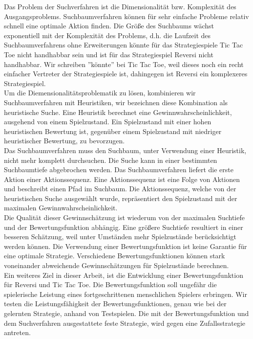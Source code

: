 Das Problem der Suchverfahren ist die Dimensionalität bzw. Komplexität des Ausgangsproblems. Suchbaumverfahren können für sehr einfache Probleme relativ schnell eine optimale Aktion finden. Die Größe des Suchbaums wächst exponentiell mit der Komplexität des Problems, d.h. die Laufzeit des Suchbaumverfahrens ohne Erweiterungen könnte für das Strategiespiele Tic Tac Toe nicht handhabbar sein und ist für das Strategiespiel Reversi nicht handhabbar. Wir schreiben ''könnte'' bei Tic Tac Toe, weil dieses noch ein recht einfacher Vertreter der Strategiespiele ist, dahingegen ist Reversi ein komplexeres Strategiespiel. \\

Um die Diemensionalitätsproblematik zu lösen, kombinieren wir Suchbaumverfahren mit Heuristiken, wir bezeichnen diese Kombination als heuristische Suche. Eine Heuristik berechnet eine Gewinnwahrscheinlichkeit, ausgehend von einem Spielzustand. Ein Spielzustand mit einer hohen heuristischen Bewertung ist, gegenüber einem Spielzustand mit niedriger heuristischer Bewertung, zu bevorzugen. \\

Das Suchbaumverfahren muss den Suchbaum, unter Verwendung einer Heuristik, nicht mehr komplett durchsuchen. Die Suche kann in einer bestimmten Suchbaumtiefe abgebrochen werden. Das Suchbaumverfahren liefert die erste Aktion einer Aktionssequenz. Eine Aktionssequenz ist eine Folge von Aktionen und beschreibt einen Pfad im Suchbaum. Die Aktionssequenz, welche von der heuristischen Suche ausgewählt wurde, repräsentiert den Spielzustand mit der maximalen Gewinnwahrscheinlichkeit. \\

Die Qualität dieser Gewinnschätzung ist wiederum von der maximalen Suchtiefe und der Bewertungsfunktion abhängig. Eine größere Suchtiefe resultiert in einer besseren Schätzung, weil unter Umständen mehr Spielzustände berücksichtigt werden können. Die Verwendung einer Bewertungsfunktion ist keine Garantie für eine optimale Strategie. Verschiedene Bewertungsfunktionen können stark voneinander abweichende Gewinnschätzungen für Spielzustände berechnen. \\

Ein weiteres Ziel in dieser Arbeit, ist die Entwicklung einer Bewertungsfunktion für Reversi und Tic Tac Toe. Die Bewertungsfunktion soll ungefähr die spielerische Leistung eines fortgeschrittenen menschlichen Spielers erbringen. Wir testen die Leistungsfähigkeit der Bewertungsfunktionen, genau wie bei der gelernten Strategie, anhand von Testspielen. Die mit der Bewertungsfunktion und dem Suchverfahren ausgestattete feste Strategie, wird gegen eine Zufallsstrategie antreten. 






